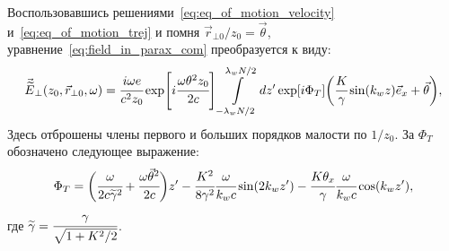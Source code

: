 Воспользовавшись решениями~\ref{eq:eq_of_motion_velocity} и~\ref{eq:eq_of_motion_trej} и помня $\vec{r}_{\bot 0}/z_0 = \vec{\theta}$, уравнение~\ref{eq:field_in_parax_com} преобразуется к виду:
\begin{equation}
	\label{eq:field_in_parax}
	\begin{array}{lcl}
		\vec{\widetilde{E}}_{\bot}(z_0,  \vec{r}_{\bot 0}, \omega) =
		\cfrac{i\omega e}{c^2z_0} \exp[i\cfrac{\omega \theta^2 z_0}{2c}]
	 	\displaystyle\int\limits_{-\lambda_w N/2}^{\lambda_w N/2} dz'\exp[i\Phi_T]
		\bigg(\cfrac{K}{\gamma}\sin(k_w z)\vec{e}_x + \vec{\theta}\bigg),
	\end{array}	
\end{equation}
Здесь отброшены члены первого и больших порядков малости по $1/z_0$. За $\Phi_T$ обозначено следующее выражение:
\begin{equation}
	\Phi_T = 
	\bigg(\cfrac{\omega}{2c\widetilde{\gamma}^2} + 
	\cfrac{\omega\vec{\theta}^2}{2c}\bigg)z' - 
	\cfrac{K^2}{8\gamma^2}\cfrac{\omega}{k_w c}\sin(2k_wz') - \cfrac{K{\theta_x}}{\gamma}\cfrac{\omega}{k_w c}\cos(k_w z'),
\end{equation}
где $\widetilde{\gamma} = \cfrac{\gamma}{\sqrt{1 + K^2/2}}$.\\

